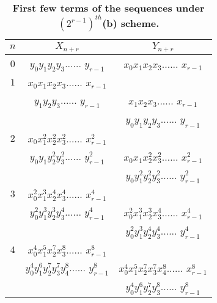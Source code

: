\begin{table}[H]
\begin{center}
\begin{tabular}{ccc}
  \hline
 $ n $ & $ X_{n+r} $ &  $Y_{n+r}$\\
  \hline
  $0 $ & $ y_{0} y_{1} y_{2} y_{3} $...... $ y_{r-1} $ & $x_{0} x_{1} x_{2} x_{3} $...... $x_{r-1} $\\
	\hline
  $1 $ & $ x_{0} x_{1}x_{2} x_{3} $...... $ x_{r-1}$\\&$ y_{1} y_{2} y_{3} $...... $ y_{r-1} $ & $ x_{1} x_{2} x_{3} $...... $ x_{r-1}$\\&&$ y_{0} y_{1} y_{2} y_{3} $...... $ y_{r-1} $\\
	\hline
  $2 $ & $ x_{0} x_{1}^2 x_{2}^2 x_{3}^2 $...... $x_{r-1}^2$\\&$ y_{0} y_{1} y_{2}^2 y_{3}^2 $...... $ y_{r-1}^2 $ &  $x_{0} x_{1} x_{2}^2 x_{3}^2 $...... $ x_{r-1}^2$\\&&$ y_{0} y_{1}^2 y_{2}^2 y_{3}^2 $...... $ y_{r-1}^2$ \\
	\hline
  $3 $ & $x_{0}^2 x_{1}^3 x_{2}^4 x_{3}^4 $...... $ x_{r-1}^4$\\&$ y_{0}^2 y_{1}^3 y_{2}^3 y_{3}^4 $...... $ y_{r-1}^4 $ &  $x_{0}^2 x_{1}^3 x_{2}^3 x_{3}^4 $...... $ x_{r-1}^4$\\&&$ y_{0}^2 y_{1}^3 y_{2}^4 y_{3}^4 $...... $ y_{r-1}^4$\\
	\hline
  $4 $ &  $x_{0}^4 x_{1}^5x_{2}^7 x_{3}^8 $...... $ x_{r-1}^8$\\&$ y_{0}^4 y_{1}^6 y_{2}^7 y_{3}^7 y_{4}^8 $...... $ y_{r-1}^8 $ &  $x_{0}^4 x_{1}^5 x_{2}^7 x_{3}^7 x_{4}^8 $...... $ x_{r-1}^8$\\&&$ y_{0}^4 y_{1}^6 y_{2}^7 y_{3}^8 $...... $ y_{r-1}^8$ \\
  \hline
\end{tabular}
\caption{\textbf{First few terms of the sequences under $(2^{r-1})^{th}$(b) scheme.}}
\label{t1} 
\end{center}
\end{table}

